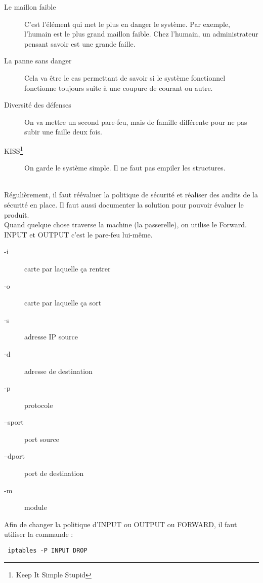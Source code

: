 \begin{description}
\item[Le maillon faible] C'est l'élément qui met le plus en danger le système. Par exemple, l'humain est le plus grand maillon faible. Chez l'humain, un administrateur pensant savoir est une grande faille.
\item[La panne sans danger] Cela va être le cas permettant de savoir si le système fonctionnel fonctionne toujours suite à une coupure de courant ou autre.
\item[Diversité des défenses] On va mettre un second pare-feu, mais de famille différente pour ne pas subir une faille deux fois.
\item[KISS\footnote{Keep It Simple Stupid}] On garde le système simple. Il ne faut pas empiler les structures.
\end{description}
~\\
Régulièrement, il faut réévaluer la politique de sécurité et réaliser des audits de la sécurité en place. Il faut aussi documenter  la solution pour pouvoir évaluer le produit.\\
Quand quelque chose traverse la machine (la passerelle), on utilise le Forward. INPUT et OUTPUT c'est le pare-feu lui-même.\\
\begin{description}
 \item[-i] carte par laquelle ça rentrer
 \item[-o] carte par laquelle ça sort
 \item[-s] adresse IP source
 \item[-d] adresse de destination
 \item[-p] protocole
 \item[--sport] port source
 \item[--dport] port de destination
 \item[-m] module
\end{description}
Afin de changer la politique d'INPUT ou OUTPUT ou FORWARD, il faut utiliser la commande :
\begin{lstlisting}
 iptables -P INPUT DROP
\end{lstlisting}
